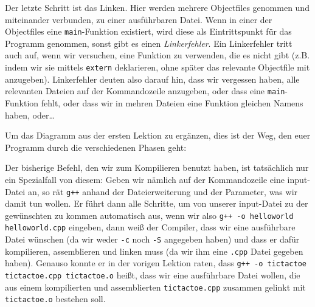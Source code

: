 Der letzte Schritt ist das Linken. Hier werden mehrere Objectfiles genommen und
miteinander verbunden, zu einer ausführbaren Datei. Wenn in einer der
Objectfiles eine \texttt{main}-Funktion existiert, wird diese als
Eintrittspunkt für das Programm genommen, sonst gibt es einen
\emph{Linkerfehler}. Ein Linkerfehler tritt auch auf, wenn wir versuchen, eine
Funktion zu verwenden, die es nicht gibt (z.B. indem wir sie mittels
\texttt{extern} deklarieren, ohne später das relevante Objectfile mit
anzugeben). Linkerfehler deuten also darauf hin, dass wir vergessen haben, alle
relevanten Dateien auf der Kommandozeile anzugeben, oder dass eine
\texttt{main}-Funktion fehlt, oder dass wir in mehren Dateien eine Funktion
gleichen Namens haben, oder\dots

Um das Diagramm aus der ersten Lektion zu ergänzen, dies ist der Weg, den euer
Programm durch die verschiedenen Phasen geht:


Der bisherige Befehl, den wir zum Kompilieren benutzt haben, ist tatsächlich
nur ein Spezialfall von diesem: Geben wir nämlich auf der Kommandozeile eine
input-Datei an, so rät \texttt{g++} anhand der Dateierweiterung und der
Parameter, was wir damit tun wollen. Er führt dann alle Schritte, um von
unserer input-Datei zu der gewünschten zu kommen automatisch aus, wenn wir also
\texttt{g++ -o helloworld helloworld.cpp} eingeben, dann weiß der Compiler,
dass wir eine ausführbare Datei wünschen (da wir weder \texttt{-c} noch
\texttt{-S} angegeben haben) und dass er dafür kompilieren, assemblieren und
linken muss (da wir ihm eine \texttt{.cpp} Datei gegeben haben). Genauso konnte
er in der vorigen Lektion raten, dass \texttt{g++ -o tictactoe tictactoe.cpp
tictactoe.o} heißt, dass wir eine ausführbare Datei wollen, die aus einem
kompilierten und assemblierten \texttt{tictactoe.cpp} zusammen gelinkt mit
\texttt{tictactoe.o} bestehen soll.

